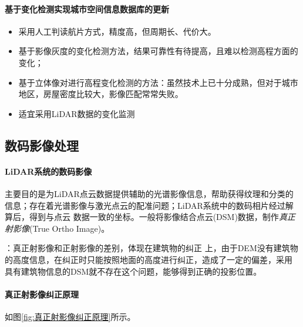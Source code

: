 \paragraph{基于变化检测实现城市空间信息数据库的更新}
\begin{itemize}
	\item 采用人工判读航片方式，精度高，但周期长、代价大。
	\item 基于影像灰度的变化检测方法，结果可靠性有待提高，且难以检测高程方面的变化；
	\item 基于立体像对进行高程变化检测的方法：虽然技术上已十分成熟，但对于城市地区，房屋密度比较大，影像匹配常常失败。
	\item 适宜采用LiDAR数据的变化监测
\end{itemize}

\subsection{数码影像处理}

\paragraph{LiDAR系统的数码影像}主要目的是为LiDAR点云数据提供辅助的光谱影像信息，帮助获得纹理和分类的信息；存在着光谱影像与激光点云的配准问题；LiDAR系统中的数码相片经过解算后，得到与点云 数据一致的坐标。一般将影像结合点云(DSM)数据，制作\textit{真正射影像}(True Ortho Image)。

：真正射影像和正射影像的差别，体现在建筑物的纠正
上，由于DEM没有建筑物的高度信息，在纠正时只能按照地面的高度进行纠正，造成了一定的偏差，采用
具有建筑物信息的DSM就不存在这个问题，能够得到正确的投影位置。

\paragraph{真正射影像纠正原理}如图\ref{fig:真正射影像纠正原理}所示。

